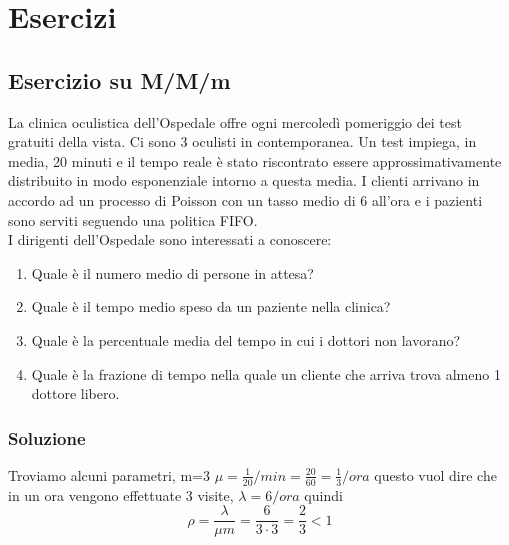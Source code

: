
\chapter{Esercizi}

\section{Esercizio su M/M/m} \label{es:m/m/m}
La clinica oculistica dell’Ospedale offre ogni mercoledì pomeriggio dei test gratuiti della vista.
Ci sono 3 oculisti in contemporanea. Un test impiega, in media, 20 minuti e il tempo reale è stato
riscontrato essere approssimativamente distribuito in modo esponenziale intorno a questa media.
I clienti arrivano in accordo ad un processo di Poisson con un tasso medio di 6 all’ora e i pazienti
sono serviti seguendo una politica FIFO.\\

\noindent I dirigenti dell’Ospedale sono interessati a conoscere:
\begin{enumerate}
    \item Quale è il numero medio di persone in attesa?
    \item Quale è il tempo medio speso da un paziente nella clinica?
    \item Quale è la percentuale media del tempo in cui i dottori non lavorano?
    \item Quale è la frazione di tempo nella quale un cliente che arriva trova almeno 1 dottore libero.
\end{enumerate}

\subsection{Soluzione}
Troviamo alcuni parametri, m=3 $\mu= \frac{1}{20}/min = \frac{20}{60} = \frac{1}{3}/ora$ questo vuol dire che in un ora vengono effettuate 3 visite, $\lambda = 6/ora$ quindi
\[\rho = \frac{\lambda}{\mu m} = \frac{6}{3 \cdot 3} = \frac{2}{3} < 1 \]

